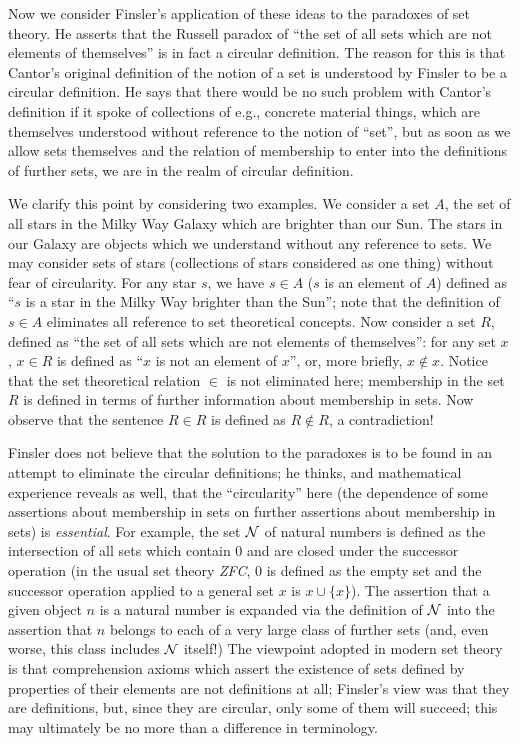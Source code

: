 Now we consider Finsler's application of these ideas to the paradoxes
of set theory.  He asserts that the Russell paradox of ``the set of
all sets which are not elements of themselves'' is in fact a circular
definition.  The reason for this is that Cantor's original definition
of the notion of a set is understood by Finsler to be a circular
definition.  He says that there would be no such problem with Cantor's
definition if it spoke of collections of e.g., concrete material
things, which are themselves understood without reference to the
notion of ``set'', but as soon as we allow sets themselves and the
relation of membership to enter into the definitions of further sets,
we are in the realm of circular definition.

We clarify this point by considering two examples.  We consider a set
$A$, the set of all stars in the Milky Way Galaxy which are brighter
than our Sun.  The stars in our Galaxy are objects which we understand
without any reference to sets.  We may consider sets of stars
(collections of stars considered as one thing) without fear of
circularity.  For any star $s$, we have $s \in A$ ($s$ is an element
of $A$) defined as ``$s$ is a star in the Milky Way brighter than the
Sun''; note that the definition of $s\in A$ eliminates all reference
to set theoretical concepts.  Now consider a set $R$, defined as ``the
set of all sets which are not elements of themselves'': for any set
$x$, $x \in R$ is defined as ``$x$ is not an element of $x$'', or,
more briefly, $x \not\in x$.  Notice that the set theoretical relation
$\in$ is not eliminated here; membership in the set $R$ is defined in
terms of further information about membership in sets.  Now observe
that the sentence $R \in R$ is defined as $R \not\in R$, a
contradiction!

Finsler does not believe that the solution to the paradoxes is to be
found in an attempt to eliminate the circular definitions; he thinks,
and mathematical experience reveals as well, that the ``circularity''
here (the dependence of some assertions about membership in sets on
further assertions about membership in sets) is {\em essential\/}.
For example, the set $\cal N$ of natural numbers is defined as the
intersection of all sets which contain 0 and are closed under the
successor operation (in the usual set theory {\em ZFC\/}, 0 is defined
as the empty set and the successor operation applied to a general set
$x$ is $x \cup \{x\}$).  The assertion that a given object $n$ is a
natural number is expanded via the definition of $\cal N$ into the
assertion that $n$ belongs to each of a very large class of further
sets (and, even worse, this class includes $\cal N$ itself!)  The
viewpoint adopted in modern set theory is that comprehension axioms
which assert the existence of sets defined by properties of their
elements are not definitions at all; Finsler's view was that they are
definitions, but, since they are circular, only some of them will
succeed; this may ultimately be no more than a difference in
terminology.

